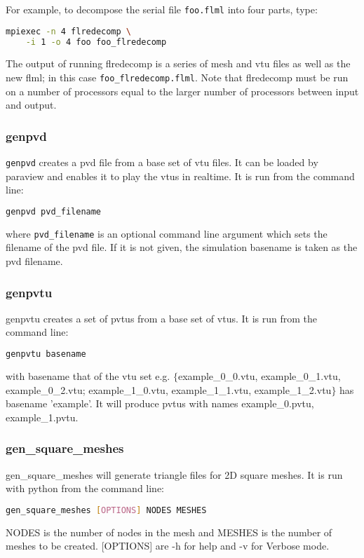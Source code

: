 For example, to decompose the serial file \lstinline+foo.flml+
into four parts, type:

\begin{lstlisting}[language=bash]
mpiexec -n 4 flredecomp \
    -i 1 -o 4 foo foo_flredecomp
\end{lstlisting}

The output of running flredecomp is a series of mesh and vtu files as well
as the new flml; in this case \lstinline+foo_flredecomp.flml+.
Note that flredecomp must be run on a number of processors equal to the larger number of processors between input and output.


\subsubsection{genpvd}
\label{sec:genpvd}
\texttt{genpvd} creates a pvd file from a base set of vtu files. It can be loaded by paraview and enables it to play the vtus in realtime. It is run from the command line:
\begin{lstlisting}[language = Bash]
genpvd pvd_filename
\end{lstlisting}
where \texttt{pvd\_filename} is an optional command line argument which sets the filename of the pvd file. If it is not given, the simulation basename is taken as the pvd filename.


\subsubsection{genpvtu}
\label{sec:genpvtu}
genpvtu creates a set of pvtus from a base set of vtus. It is run from the command line:
\begin{lstlisting}[language = Bash]
genpvtu basename 
\end{lstlisting}
with basename that of the vtu set e.g. $\{$example\_0\_0.vtu, example\_0\_1.vtu, example\_0\_2.vtu; example\_1\_0.vtu, example\_1\_1.vtu, example\_1\_2.vtu$\}$ has basename 'example'. It will produce pvtus with names example\_0.pvtu, example\_1.pvtu.


\subsubsection{gen\_square\_meshes}
\label{sec:gen_square_meshes}
gen\_square\_meshes will generate triangle files for 2D square meshes. It is run with python from the command line:
\begin{lstlisting}[language = Bash]
gen_square_meshes [OPTIONS] NODES MESHES 
\end{lstlisting} 
NODES is the number of nodes in the mesh and MESHES is the number of meshes to be created. [OPTIONS] are -h for help and -v for Verbose mode.

